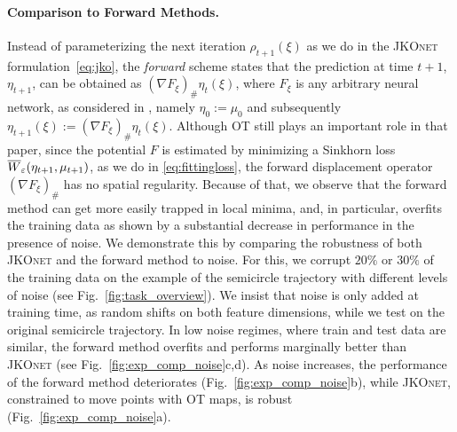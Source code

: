 \paragraph{Comparison to Forward Methods.} \label{sec:eval_comp_fb}
Instead of parameterizing the next iteration $\rho_{t+1}(\xi)$ as we do in the \textsc{JKOnet} formulation~\eqref{eq:jko}, the \emph{forward} scheme states that the prediction at time $t+1$, $\eta_{t+1}$, can be obtained as $(\nabla F_\xi)_{\#} \eta_t(\xi)$, where $F_\xi$ is any arbitrary neural network, as considered in \citet{hashimoto2016learning}, namely $\eta_0:=\mu_0$ and subsequently $\eta_{t+1}(\xi):=(\nabla F_\xi)_{\#} \eta_t(\xi)$. Although OT still plays an important role in that paper, since the potential $F$ is estimated by minimizing a Sinkhorn loss $\overline{W}_{\varepsilon}(\eta_{t+1},\mu_{t+1})$, as we do in \eqref{eq:fittingloss}, the forward displacement operator $(\nabla F_\xi)_{\#}$ has no spatial regularity. Because of that, we observe that the forward method can get more easily trapped in local minima, and, in particular, overfits the training data as shown by a substantial decrease in performance in the presence of noise.
We demonstrate this by comparing the robustness of both \textsc{JKOnet} and the forward method to noise. For this, we corrupt $20\%$ or $30\%$ of the training data on the example of the semicircle trajectory with different levels of noise (see Fig.~\ref{fig:task_overview}). We insist that noise is only added at training time, as random shifts on both feature dimensions, while we test on the original semicircle trajectory.
In low noise regimes, where train and test data are similar, the forward method overfits and performs marginally better than \textsc{JKOnet} (see Fig.~\ref{fig:exp_comp_noise}c,d). As noise increases, the performance of the forward method deteriorates (Fig.~\ref{fig:exp_comp_noise}b), while \textsc{JKOnet}, constrained to move points with OT maps, is robust (Fig.~\ref{fig:exp_comp_noise}a).%


